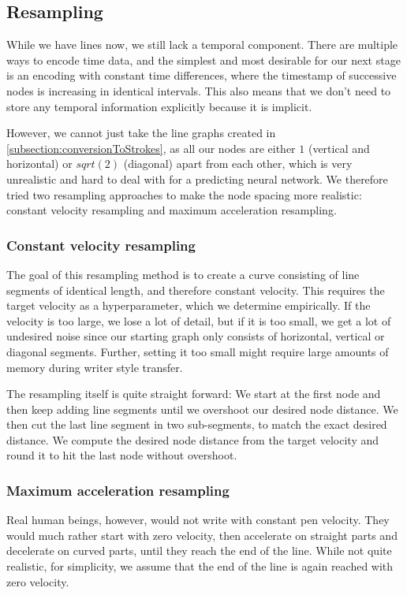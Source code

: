 \subsection{Resampling}\label{sec:resampling}
While we have lines now, we still lack a temporal component. There are multiple ways to encode time data, and the simplest and most desirable for our next stage is an encoding with constant time differences, where the timestamp of successive nodes is increasing in identical intervals. This also means that we don't need to store any temporal information explicitly because it is implicit.

However, we cannot just take the line graphs created in \cref{subsection:conversionToStrokes}, as all our nodes are either $1$ (vertical and horizontal) or $sqrt(2)$ (diagonal) apart from each other, which is very unrealistic and hard to deal with for a predicting neural network. We therefore tried two resampling approaches to make the node spacing more realistic: constant velocity resampling and maximum acceleration resampling.

\subsubsection{Constant velocity resampling}
The goal of this resampling method is to create a curve consisting of line segments of identical length, and therefore constant velocity. This requires the target velocity as a hyperparameter, which we determine empirically. If the velocity is too large, we lose a lot of detail, but if it is too small, we get a lot of undesired noise since our starting graph only consists of horizontal, vertical or diagonal segments. Further, setting it too small might require large amounts of memory during writer style transfer.

The resampling itself is quite straight forward: We start at the first node and then keep adding line segments until we overshoot our desired node distance. We then cut the last line segment in two sub-segments, to match the exact desired distance. We compute the desired node distance from the target velocity and round it to hit the last node without overshoot.

\subsubsection{Maximum acceleration resampling}
Real human beings, however, would not write with constant pen velocity. They would much rather start with zero velocity, then accelerate on straight parts and decelerate on curved parts, until they reach the end of the line. While not quite realistic, for simplicity, we assume that the end of the line is again reached with zero velocity.

